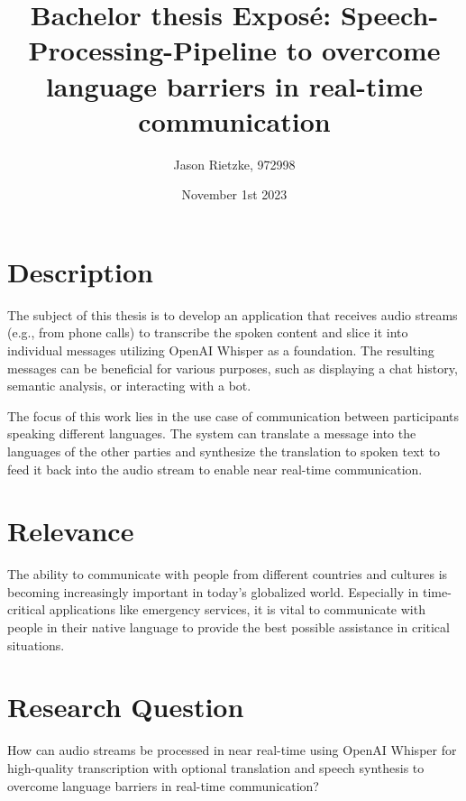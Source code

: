 \documentclass[a4paper,10pt]{report}
\title{Bachelor thesis Exposé: Speech-Processing-Pipeline to overcome language barriers in real-time communication}
\date{November 1st 2023}
\author{Jason Rietzke, 972998}
\begin{document}
\maketitle

\restoregeometry %
\nopagecolor%


\section{Description}
The subject of this thesis is to develop an application that receives audio streams (e.g., from phone calls) to transcribe the spoken content and slice it into individual messages utilizing OpenAI Whisper as a foundation.
The resulting messages can be beneficial for various purposes, such as displaying a chat history, semantic analysis, or interacting with a bot.

The focus of this work lies in the use case of communication between participants speaking different languages. 
The system can translate a message into the languages of the other parties and synthesize the translation to spoken text to feed it back into the audio stream to enable near real-time communication.


\section{Relevance}
The ability to communicate with people from different countries and cultures is becoming increasingly important in today's globalized world.
Especially in time-critical applications like emergency services, it is vital to communicate with people in their native language to provide the best possible assistance in critical situations.


\section{Research Question}
How can audio streams be processed in near real-time using OpenAI Whisper for high-quality transcription with optional translation and speech synthesis to overcome language barriers in real-time communication?
\end{document}
